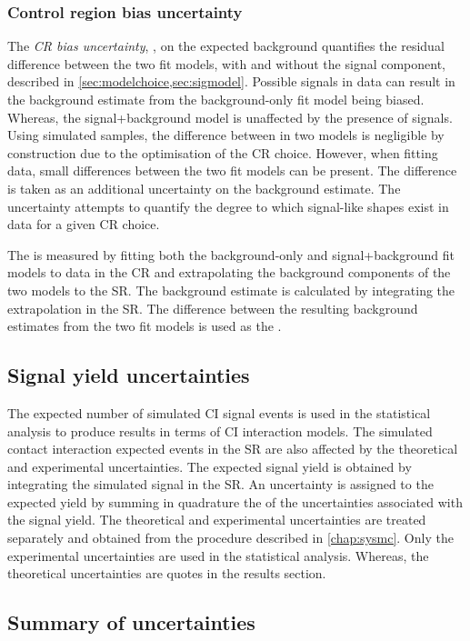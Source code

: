 \subsubsection{Control region bias uncertainty}
The \emph{CR bias uncertainty}, \CRBU, on the expected background quantifies the residual difference between the two fit models, with and without the signal component, described in \cref{sec:modelchoice,sec:sigmodel}. Possible signals in data can result in the background estimate from the background-only fit model being biased. Whereas, the signal+background model is unaffected by the presence of signals. Using simulated samples, the difference between in two models is negligible by construction due to the optimisation of the CR choice. However, when fitting data, small differences between the two fit models can be present. The difference is taken as an additional uncertainty on the background estimate. The uncertainty attempts to quantify the degree to which signal-like shapes exist in data for a given CR choice. 

The \CRBU is measured by fitting both the background-only and signal+background fit models to data in the CR and extrapolating the background components of the two models to the SR. The background estimate is calculated by integrating the extrapolation in the SR. The difference between the resulting background estimates from the two fit models is used as the \CRBU. 

\subsection{Signal yield uncertainties}
The expected number of simulated CI signal events is used in the statistical analysis to produce results in terms of CI interaction models. The simulated contact interaction expected events in the SR are also affected by the theoretical and experimental uncertainties. The expected signal yield is obtained by integrating the simulated signal in the SR. An uncertainty is assigned to the expected yield by summing in quadrature the of the uncertainties associated with the signal yield. The theoretical and experimental uncertainties are treated separately and obtained from the procedure described in \cref{chap:sysmc}. Only the experimental uncertainties are used in the statistical analysis. Whereas, the theoretical uncertainties are quotes in the results section. 

\subsection{Summary of uncertainties}

